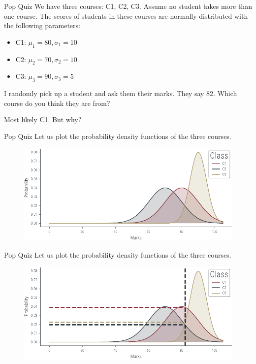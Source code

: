 \documentclass{beamer}
\begin{document}
\begin{frame}{Pop Quiz}
    We have three courses: C1, C2, C3. Assume no student takes more than one course.
    The scores of students in these courses are normally distributed with the following parameters:
    \begin{itemize}
        \item C1: $\mu_1 = 80, \sigma_1 = 10$
        \item C2: $\mu_2 = 70, \sigma_2 = 10$
        \item C3: $\mu_3 = 90, \sigma_3 = 5$
    \end{itemize}

   
    I randomly pick up a student and ask them their marks. They say 82. Which course do you think they are from?
    
    
    
    Most likely C1. But why?
    
\end{frame}

\begin{frame}{Pop Quiz}
    Let us plot the probability density functions of the three courses. 
    \begin{figure}
        \includegraphics[width=\textwidth]{../figures/mle/mle-example.pdf}
    \end{figure}
    
\end{frame}

\begin{frame}{Pop Quiz}
    Let us plot the probability density functions of the three courses. 
    \begin{figure}
        \includegraphics[width=\textwidth]{../figures/mle/mle-example-2.pdf}
    \end{figure}
    
\end{frame}
\end{document}
